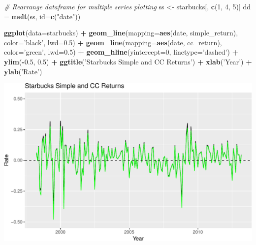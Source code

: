 \documentclass[]{article}
\newenvironment{Shaded}{\begin{snugshade}}{\end{snugshade}}
\newcommand{\KeywordTok}[1]{\textcolor[rgb]{0.13,0.29,0.53}{\textbf{#1}}}
\newcommand{\DataTypeTok}[1]{\textcolor[rgb]{0.13,0.29,0.53}{#1}}
\newcommand{\DecValTok}[1]{\textcolor[rgb]{0.00,0.00,0.81}{#1}}
\newcommand{\FloatTok}[1]{\textcolor[rgb]{0.00,0.00,0.81}{#1}}
\newcommand{\StringTok}[1]{\textcolor[rgb]{0.31,0.60,0.02}{#1}}
\newcommand{\CommentTok}[1]{\textcolor[rgb]{0.56,0.35,0.01}{\textit{#1}}}
\newcommand{\OperatorTok}[1]{\textcolor[rgb]{0.81,0.36,0.00}{\textbf{#1}}}
\newcommand{\NormalTok}[1]{#1}
\begin{document}
\begin{Shaded}
\begin{Highlighting}[]
\CommentTok{# Rearrange dataframe for multiple series plotting}
\NormalTok{ss <-}\StringTok{ }\NormalTok{starbucks[, }\KeywordTok{c}\NormalTok{(}\DecValTok{1}\NormalTok{, }\DecValTok{4}\NormalTok{, }\DecValTok{5}\NormalTok{)]}
\NormalTok{dd =}\StringTok{ }\KeywordTok{melt}\NormalTok{(ss, }\DataTypeTok{id=}\KeywordTok{c}\NormalTok{(}\StringTok{"date"}\NormalTok{))}

\KeywordTok{ggplot}\NormalTok{(}\DataTypeTok{data=}\NormalTok{starbucks) }\OperatorTok{+}
\StringTok{  }\KeywordTok{geom_line}\NormalTok{(}\DataTypeTok{mapping=}\KeywordTok{aes}\NormalTok{(date, simple_return), }\DataTypeTok{color=}\StringTok{'black'}\NormalTok{, }\DataTypeTok{lwd=}\FloatTok{0.5}\NormalTok{) }\OperatorTok{+}
\StringTok{  }\KeywordTok{geom_line}\NormalTok{(}\DataTypeTok{mapping=}\KeywordTok{aes}\NormalTok{(date, cc_return), }\DataTypeTok{color=}\StringTok{'green'}\NormalTok{, }\DataTypeTok{lwd=}\FloatTok{0.5}\NormalTok{) }\OperatorTok{+}
\StringTok{  }\KeywordTok{geom_hline}\NormalTok{(}\DataTypeTok{yintercept=}\DecValTok{0}\NormalTok{, }\DataTypeTok{linetype=}\StringTok{'dashed'}\NormalTok{) }\OperatorTok{+}
\StringTok{  }\KeywordTok{ylim}\NormalTok{(}\OperatorTok{-}\FloatTok{0.5}\NormalTok{, }\FloatTok{0.5}\NormalTok{) }\OperatorTok{+}
\StringTok{  }\KeywordTok{ggtitle}\NormalTok{(}\StringTok{'Starbucks Simple and CC Returns'}\NormalTok{) }\OperatorTok{+}
\StringTok{  }\KeywordTok{xlab}\NormalTok{(}\StringTok{'Year'}\NormalTok{) }\OperatorTok{+}
\StringTok{  }\KeywordTok{ylab}\NormalTok{(}\StringTok{'Rate'}\NormalTok{)}
\end{Highlighting}
\end{Shaded}

\includegraphics{homework_1_markdown_files/figure-latex/unnamed-chunk-17-1.pdf}
\end{document}
